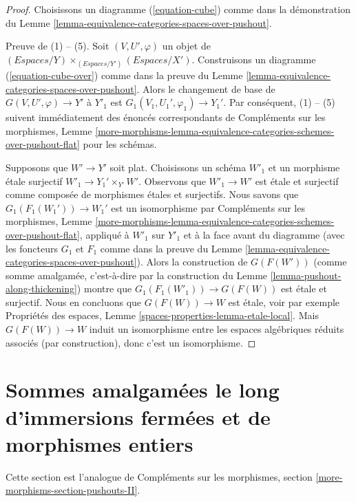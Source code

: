 \begin{proof}
Choisissons un diagramme (\ref{equation-cube}) comme dans la démonstration du
Lemme \ref{lemma-equivalence-categories-spaces-over-pushout}.

\medskip\noindent
Preuve de (1) -- (5). Soit $(V, U', \varphi)$ un objet de
$(\textit{Espaces}/Y) \times_{(\textit{Espaces}/Y')} (\textit{Espaces}/X')$.
Construisons un diagramme (\ref{equation-cube-over}) comme dans la preuve du
Lemme \ref{lemma-equivalence-categories-spaces-over-pushout}.
Alors le changement de base de $G(V, U', \varphi) \to Y'$ à
$Y'_1$ est $G_1(V_1, U_1', \varphi_1) \to Y_1'$. Par conséquent, (1) -- (5)
suivent immédiatement des énoncés correspondants de Compléments sur les morphismes, Lemme
\ref{more-morphisms-lemma-equivalence-categories-schemes-over-pushout-flat}
pour les schémas.

\medskip\noindent
Supposons que $W' \to Y'$ soit plat. Choisissons un schéma $W'_1$ et un morphisme \'etale surjectif $W'_1 \to Y_1' \times_{Y'} W'$. Observons que $W'_1 \to W'$ est \'etale et surjectif comme composée de morphismes \'etales et surjectifs. Nous savons que $G_1(F_1(W_1')) \to W_1'$ est un isomorphisme par Compléments sur les morphismes, Lemme \ref{more-morphisms-lemma-equivalence-categories-schemes-over-pushout-flat}, appliqué à $W'_1$ sur $Y'_1$ et à la face avant du diagramme (avec les foncteurs $G_1$ et $F_1$ comme dans la preuve du Lemme \ref{lemma-equivalence-categories-spaces-over-pushout}).
Alors la construction de $G(F(W'))$ (comme somme amalgamée, c'est-à-dire par la construction du Lemme \ref{lemma-pushout-along-thickening}) montre que $G_1(F_1(W'_1)) \to G(F(W))$ est \'etale et surjectif. Nous en concluons que $G(F(W)) \to W$ est \'etale, voir par exemple Propriétés des espaces, Lemme \ref{spaces-properties-lemma-etale-local}.
Mais $G(F(W)) \to W$ induit un isomorphisme entre les espaces algébriques réduits associés (par construction), donc c'est un isomorphisme.
\end{proof}







\section{Sommes amalgamées le long d'immersions fermées et de morphismes entiers}
\label{section-pushouts-II}

\noindent
Cette section est l'analogue de
Compléments sur les morphismes, section \ref{more-morphisms-section-pushouts-II}.

